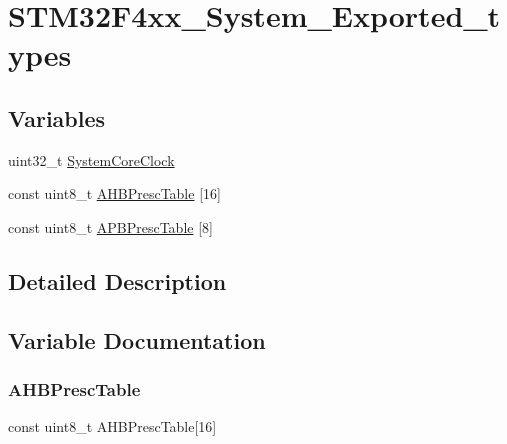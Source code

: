 \hypertarget{group___s_t_m32_f4xx___system___exported__types}{}\section{S\+T\+M32\+F4xx\+\_\+\+System\+\_\+\+Exported\+\_\+types}
\label{group___s_t_m32_f4xx___system___exported__types}
\subsection*{Variables}
\begin{DoxyCompactItemize}
\item 
uint32\+\_\+t \hyperlink{group___s_t_m32_f4xx___system___exported__types_gaa3cd3e43291e81e795d642b79b6088e6}{System\+Core\+Clock}
\item 
const uint8\+\_\+t \hyperlink{group___s_t_m32_f4xx___system___exported__types_ga6e1d9cd666f0eacbfde31e9932a93466}{A\+H\+B\+Presc\+Table} \mbox{[}16\mbox{]}
\item 
const uint8\+\_\+t \hyperlink{group___s_t_m32_f4xx___system___exported__types_ga5b4f8b768465842cf854a8f993b375e9}{A\+P\+B\+Presc\+Table} \mbox{[}8\mbox{]}
\end{DoxyCompactItemize}


\subsection{Detailed Description}


\subsection{Variable Documentation}
\mbox{\label{group___s_t_m32_f4xx___system___exported__types_ga6e1d9cd666f0eacbfde31e9932a93466}} 
\subsubsection{\texorpdfstring{A\+H\+B\+Presc\+Table}{AHBPrescTable}}
{\footnotesize\ttfamily const uint8\+\_\+t A\+H\+B\+Presc\+Table\mbox{[}16\mbox{]}}

